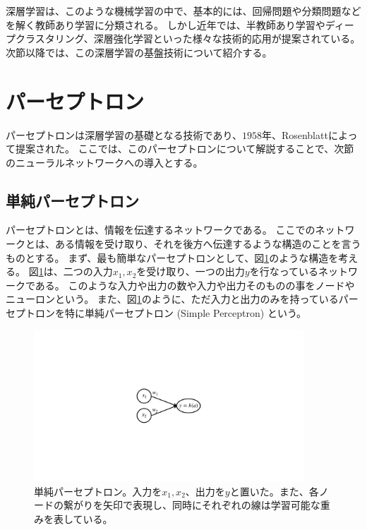 深層学習は、このような機械学習の中で、基本的には、回帰問題や分類問題などを解く教師あり学習に分類される。
しかし近年では、半教師あり学習やディープクラスタリング、深層強化学習といった様々な技術的応用が提案されている。
次節以降では、この深層学習の基盤技術について紹介する。


\section{パーセプトロン} \label{DL:Perceptron}

パーセプトロンは深層学習の基礎となる技術であり、$1958$年、Rosenblattによって提案された\cite{PerceptronPaper}。
ここでは、このパーセプトロンについて解説することで、次節のニューラルネットワークへの導入とする。


\subsection{単純パーセプトロン} \label{DL:Percep:SimplePerceptron}

パーセプトロンとは、情報を伝達するネットワークである。
ここでのネットワークとは、ある情報を受け取り、それを後方へ伝達するような構造のことを言うものとする。
まず、最も簡単なパーセプトロンとして、図\ref{2SimplePerceptron}のような構造を考える。
図\ref{2SimplePerceptron}は、二つの入力$x_1,x_2$を受け取り、一つの出力$y$を行なっているネットワークである。
このような入力や出力の数や入力や出力そのものの事をノードやニューロンという。
また、図\ref{2SimplePerceptron}のように、ただ入力と出力のみを持っているパーセプトロンを特に単純パーセプトロン (Simple Perceptron) という。

\begin{figure}[htbp]
 \centering
 \includegraphics[trim = 250 350 250 350, width=0.9\textwidth, clip]{Figure/2DeepLearning/2SimplePerceptron.png}
 \caption[単純パーセプトロン]{単純パーセプトロン。入力を$x_1,x_2$、出力を$y$と置いた。また、各ノードの繋がりを矢印で表現し、同時にそれぞれの線は学習可能な重みを表している。}
 \label{2SimplePerceptron}
\end{figure}

